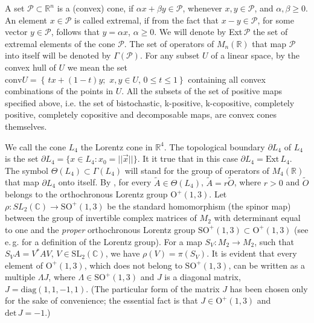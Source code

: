 \documentclass[12pt]{article}
\theoremstyle{plain}
\theoremstyle{definition}
\theoremstyle{remark}
\numberwithin{equation}{section}
\begin{document}
A set $\mathcal{P} \subset \mathbb{R}^{n}$ is a
(convex) cone,
if $\alpha x + \beta y \in \mathcal{P}$,
whenever $x, y \in \mathcal{P}$,
and $\alpha, \beta \geq 0$.
An element $x \in \mathcal{P}$ is called extremal,
if from the fact that $x - y \in \mathcal{P}$,
for some vector $y \in \mathcal{P}$,
follows that $y = \alpha x$, $\alpha \geq 0$.
We will denote by Ext\,$\mathcal{P}$ the set of extremal elements of
the cone $\mathcal{P}$.
The set of operators  of $M_{n}(\mathbb{R})$ that map $\mathcal{P}$ into itself
will be denoted by $\Gamma(\mathcal{P})$.
For any subset $U$ of a linear space, by the convex hull of $U$
we mean the set
$\text{conv} U = \left \{ \, tx + (1-t)y;
\,\, x,y \in U, \, 0 \leq t \leq 1 \right \}$
containing all convex combinations of the points in $U$.
All the subsets of the set of positive maps specified above,
i.e. the set of bistochastic, k-positive, k-copositive, completely positive,
completely copositive and decomposable maps,
are convex cones themselves.

We call the cone $L_{4}$ the Lorentz cone
in $\mathbb{R}^{4}$.
The topological boundary $\partial L_{4}$ of $L_{4}$ is the set
$\partial L_{4} = \{ x \in L_{4} : x_{0} = || \vec{x} || \}$.
It it true that in this case $\partial L_{4} = \text{Ext}\,L_{4}$.
The symbol $\Theta(L_{4}) \subset \Gamma(L_{4})$
will stand for the group
of operators of $M_{4}(\mathbb{R})$
that map $\partial L_{4}$ onto itself.
By \cite[Theorem 2.4]{loewy1975positive},
for every $\tilde{A} \in \Theta(L_{4})$,
$\tilde{A} = r \tilde{O}$,
where $r > 0$ and $\tilde{O}$ belongs to
the orthochronous Lorentz group
$\mathrm{O}^{+}(1,3)$.
Let $\rho: SL_{2}(\mathbb{C}) \rightarrow \text{SO}^{+}(1,3)$
be the standard homomorphism (the spinor map)
between the group of invertible
complex matrices of $M_{2}$
with determinant equal to one
and the \emph{proper} orthochronous Lorentz group $\text{SO}^{+}(1,3)
\subset \text{O}^{+}(1,3)$
(see e.\,g. \cite{naber1992geometry} for a definition of the Lorentz group).
For a map $S_{V}: M_{2} \rightarrow M_{2}$,
such that $S_{V} A = V^{*} A V$, $V \in \text{SL}_{2}(\mathbb{C})$,
we have
$\rho(V) = \pi(S_{V})$.
It is evident that every element of $\text{O}^{+}(1,3)$,
which does not belong to $\text{SO}^{+}(1,3)$,
can be written as a multiple $\Lambda J$,
where $\Lambda \in \text{SO}^{+}(1,3)$ and $J$  is a diagonal matrix,
$J = \mathrm{diag}(1,1,-1,1)$.
(The particular form of the matrix $J$ has been chosen
only for the sake of convenience;
the essential fact is that 
$J \in \text{O}^{+}(1,3)$ and
$\mathrm{det} \, J = -1$.)
\end{document}
